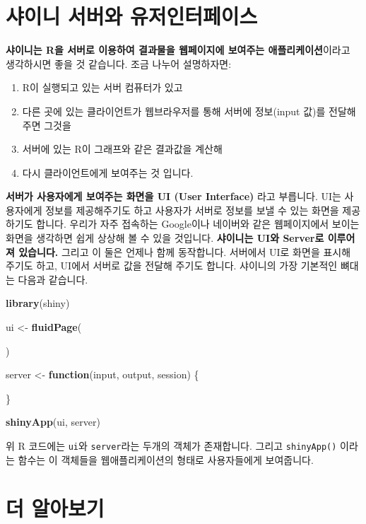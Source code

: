 \documentclass[]{book}
\newenvironment{Shaded}{\begin{snugshade}}{\end{snugshade}}
\newcommand{\KeywordTok}[1]{\textcolor[rgb]{0.13,0.29,0.53}{\textbf{#1}}}
\newcommand{\StringTok}[1]{\textcolor[rgb]{0.31,0.60,0.02}{#1}}
\newcommand{\ControlFlowTok}[1]{\textcolor[rgb]{0.13,0.29,0.53}{\textbf{#1}}}
\newcommand{\NormalTok}[1]{#1}
\providecommand{\tightlist}{%
  \setlength{\itemsep}{0pt}\setlength{\parskip}{0pt}}
\begin{document}
\section{샤이니 서버와 유저인터페이스}\label{--}

\textbf{샤이니는 R을 서버로 이용하여 결과물을 웹페이지에 보여주는
애플리케이션}이라고 생각하시면 좋을 것 같습니다. 조금 나누어 설명하자면:

\begin{enumerate}
\def\labelenumi{\arabic{enumi}.}
\tightlist
\item
  R이 실행되고 있는 서버 컴퓨터가 있고
\item
  다른 곳에 있는 클라이언트가 웹브라우저를 통해 서버에 정보(input 값)를
  전달해주면 그것을
\item
  서버에 있는 R이 그래프와 같은 결과값을 계산해
\item
  다시 클라이언트에게 보여주는 것 입니다.
\end{enumerate}

\textbf{서버가 사용자에게 보여주는 화면을 UI (User Interface)} 라고
부릅니다. UI는 사용자에게 정보를 제공해주기도 하고 사용자가 서버로
정보를 보낼 수 있는 화면을 제공하기도 합니다. 우리가 자주 접속하는
Google이나 네이버와 같은 웹페이지에서 보이는 화면을 생각하면 쉽게 상상해
볼 수 있을 것입니다. \textbf{샤이니는 UI와 Server로 이루어져 있습니다.}
그리고 이 둘은 언제나 함께 동작합니다. 서버에서 UI로 화면을 표시해
주기도 하고, UI에서 서버로 값을 전달해 주기도 합니다. 샤이니의 가장
기본적인 뼈대는 다음과 같습니다.

\begin{Shaded}
\begin{Highlighting}[]
\KeywordTok{library}\NormalTok{(shiny)}

\NormalTok{ui <-}\StringTok{ }\KeywordTok{fluidPage}\NormalTok{(}
  
\NormalTok{)}

\NormalTok{server <-}\StringTok{ }\ControlFlowTok{function}\NormalTok{(input, output, session) \{}
  
\NormalTok{\}}

\KeywordTok{shinyApp}\NormalTok{(ui, server)}
\end{Highlighting}
\end{Shaded}

위 R 코드에는 \texttt{ui}와 \texttt{server}라는 두개의 객체가
존재합니다. 그리고 \texttt{shinyApp()} 이라는 함수는 이 객체들을
웹애플리케이션의 형태로 사용자들에게 보여줍니다.

\section{더 알아보기}\label{-}
\end{document}

